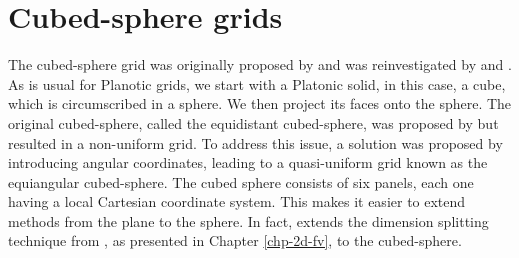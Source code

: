 \chapter{Cubed-sphere grids}
\label{chp-cs-grids}

The cubed-sphere grid was originally proposed by \citet{sadourny:1972} and was 
reinvestigated by \citet{ronchi:1996} and \citet{rancic:1996}. 
As is usual for Planotic grids, we start with a Platonic solid, in this case, a cube, 
which is circumscribed in a sphere. We then project its faces onto the sphere.
The original cubed-sphere, called the equidistant cubed-sphere, was proposed by 
\citet{sadourny:1972} but resulted in a non-uniform grid. 
To address this issue, a solution was proposed by introducing angular coordinates, 
leading to a quasi-uniform grid known as the equiangular cubed-sphere.
The cubed sphere consists of six panels, each one having a local Cartesian coordinate 
system. 
This makes it easier to extend methods from the plane to the sphere. 
In fact, \citet{putman:2007} extends the dimension splitting technique from 
\citet{lin:1996}, as presented in Chapter \ref{chp-2d-fv}, to the cubed-sphere.

